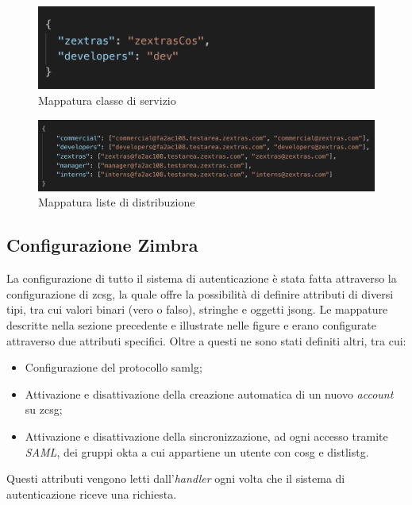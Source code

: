     \begin{figure}[h]
        \centering
        \includegraphics[width=1\textwidth]{immagini/cosMapping.png}
        \caption{Mappatura classe di servizio}
        \label{fig: Mappatura classe di servizio}
    \end{figure}
    
     \begin{figure}[h]
        \centering
        \includegraphics[width=1\textwidth]{immagini/distListMapping.png}
        \caption{Mappatura liste di distribuzione}
        \label{fig: Mappatura liste di distribuzione}
    \end{figure}

\subsection{Configurazione Zimbra}
La configurazione di tutto il sistema di autenticazione è stata fatta attraverso la configurazione di \gls{zcsg}, la quale offre la possibilità di definire attributi di diversi tipi, tra cui valori binari (vero o falso), stringhe e oggetti \gls{jsong}. Le mappature descritte nella sezione precedente e illustrate nelle figure  e  erano configurate attraverso due attributi specifici. Oltre a questi ne sono stati definiti altri, tra cui:
\begin{itemize}
    \item Configurazione del protocollo \gls{samlg};
    \item Attivazione e disattivazione della creazione automatica di un nuovo \textit{account}  su \gls{zcsg};
    \item Attivazione e disattivazione della sincronizzazione, ad ogni accesso tramite \textit{SAML}, dei gruppi \gls{okta} a cui appartiene un utente con \gls{cosg} e \gls{distlistg}.
\end{itemize}
Questi attributi vengono letti dall'\textit{handler} ogni volta che il sistema di autenticazione riceve una richiesta.


